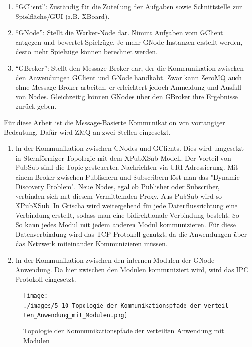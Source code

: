 \documentclass{article}
\begin{document}
\begin{enumerate}
\def\labelenumi{\arabic{enumi}.}
\itemsep1pt\parskip0pt
\item  ``GClient'': Zuständig für die Zuteilung der Aufgaben sowie
  Schnittstelle zur Spielfläche/GUI (z.B. XBoard). \cite[p.8]{rosenfeld_messaging_2019}
\item  ``GNode'': Stellt die Worker-Node dar. Nimmt Aufgaben vom GClient
  entgegen und bewertet Spielzüge. Je mehr GNode Instanzen erstellt
  werden, desto mehr Spielzüge können berechnet werden. \cite[p.9]{rosenfeld_messaging_2019}
\item  ``GBroker'': Stellt den Message Broker dar, der die Kommunikation
  zwischen den Anwendungen GClient und GNode handhabt. Zwar kann ZeroMQ
  auch ohne Message Broker arbeiten, er erleichtert jedoch Anmeldung und
  Ausfall von Nodes. Gleichzeitig können GNodes über den GBroker ihre
  Ergebnisse zurück geben. \cite[p. 13]{rosenfeld_messaging_2019}
\end{enumerate}

Für diese Arbeit ist die Message-Basierte Kommunikation von vorrangiger
Bedeutung. Dafür wird ZMQ an zwei Stellen eingesetzt.


\begin{enumerate}
\def\labelenumi{\arabic{enumi}.}
\itemsep1pt\parskip0pt
\item In der Kommunikation zwischen GNodes und GClients. Dies wird umgesetzt
in Sternförmiger Topologie mit dem XPubXSub Modell. Der Vorteil von PubSub sind die
Topic-gesteuerten Nachrichten via URI Adressierung. Mit einem Broker zwischen Publishern und Subscribern löst man das "Dynamic Discovery Problem". Neue Nodes, egal ob Publisher oder Subscriber, verbinden sich mit diesem Vermittelnden Proxy. Aus PubSub wird so XPubXSub. 
In Grischa wird weitergehend für jede Datenflussrichtung eine Verbindung erstellt, sodass man eine bidirektionale Verbindung besteht. So
So kann jedes Modul mit jedem anderen Modul kommunizieren. \cite[p. 43]{rosenfeld_messaging_2019} Für diese Datenverbindung wird das TCP Protokoll genutzt, da die Anwendungen über das Netzwerk miteinander Kommunizieren müssen.  
\item In der Kommunikation zwischen den internen Modulen der GNode Anwendung. Da hier zwischen den Modulen kommuniziert wird, wird das IPC Protokoll eingesetzt.
\end{enumerate}

\begin{figure}[htbp]
\centering
\texttt{[image: ./images/5\_10\_Topologie\_der\_Kommunikationspfade\_der\_verteilten\_Anwendung\_mit\_Modulen.png]}
\caption{Topologie der Kommunikationspfade der verteilten Anwendung mit Modulen}
\end{figure}
\end{document}
